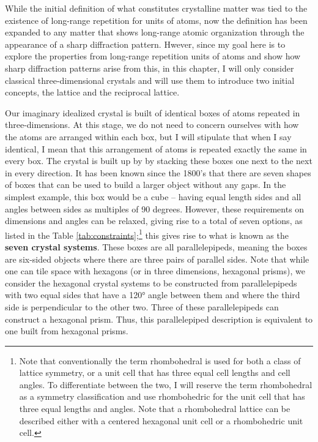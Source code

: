 While the initial definition of what constitutes crystalline matter was tied to the existence of long-range repetition for units of atoms, now the definition has been expanded to any matter that shows long-range atomic organization through the appearance of a sharp diffraction pattern. 
Hwever, since my goal here is to explore the properties from long-range repetition units of atoms and show how sharp diffraction patterns arise from this, in this chapter, I will only consider classical three-dimensional crystals and will use them to introduce two initial concepts, the lattice and the reciprocal lattice. 

Our imaginary idealized crystal is built of identical boxes of atoms repeated in three-dimensions. 
At this stage, we do not need to concern ourselves with how the atoms are arranged within each box, but I will stipulate that when I say identical, I  mean that this arrangement of atoms is repeated exactly the same in every box. 
The crystal is built up by by stacking these boxes one next to the next in every direction. 
It has been known since the 1800’s that there are seven shapes of boxes that can be used to build a larger object without any gaps. 
In the simplest example, this box would be a cube – having equal length sides and all angles between sides as multiples of 90 degrees. 
However, these requirements on dimensions and angles can be relaxed, giving rise to a total of seven options, as listed in the Table \ref{tab:constraints};\footnote{Note that conventionally the term rhombohedral is used for both a class of lattice symmetry, or a unit cell that has three equal cell lengths and cell angles. To differentiate between the two, I will reserve the term rhombohedral as a symmetry classification and use rhombohedric for the unit cell that has three equal lengths and angles. Note that a rhombohedral lattice can be described either with a centered hexagonal unit cell or a rhombohedric unit cell.} this gives rise to what is known as the \textbf{seven crystal systems}. 
These boxes are all parallelepipeds, meaning the boxes are six-sided objects where there are three pairs of parallel sides. 
Note that while one can tile space with hexagons (or in three dimensions, hexagonal prisms), we consider the hexagonal crystal systems to be constructed from parallelepipeds with two equal sides that have a 120° angle between them and where the third side is perpendicular to the other two. 
Three of these parallelepipeds can construct a hexagonal prism. 
Thus, this parallelepiped description is equivalent to one built from hexagonal prisms. 

